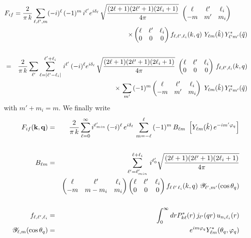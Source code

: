 \begin{eqnarray*}
\lefteqn{ F_{if} = \frac{2}{\pi \, k}  \sum_{\ell, \ell',m}
(-i)^{\ell} \,(-1)^{m} \, i^{\ell'} e^{i \delta_{\ell}} \,
\sqrt{\frac{(2 \ell + 1)(2 \ell' + 1)(2 \ell_{i} + 1)}{4 \pi }} \
\left( 
\begin{matrix}\ell & \ell' & \ell_{i} \cr -m & m' & m_{i}
\end{matrix}
\right)}
\\
 && {\times} \left( \begin{matrix}\ell & \ell' & \ell_{i} \cr 0 & 0 & 0
   \end{matrix}
 \right) f_{\ell,\ell',\ell_{i}}(k,q) \ Y_{\ell m}(\hat{k})\,
Y^{*}_{\ell' m'} (\hat{q})
 \\
\\
&=& \frac{2}{\pi \, k} \sum_{\ell'} \sum_{\ell=\mid \ell'-\ell_{i}\mid
}^{\ell' + \ell_{i}} \, i^{\ell'} \, (-i)^{\ell} e^{i
\delta_{\ell}} \, \sqrt{\frac{(2 \ell + 1)(2 \ell' + 1)(2 \ell_{i} +
1)}{4 \pi }} \ \left( \begin{matrix}\ell & \ell' & \ell_{i} \cr 0 & 0 & 0
\end{matrix}
\right) \, f_{\ell,\ell',\ell_{i}}(k,q)
\\
&& {\times} \,\sum_{m'} \, (-1)^{m} \left( 
\begin{matrix}\ell & \ell' & \ell_{i} \cr
-m & m' & m_{i}
\end{matrix}
\right) \ Y_{\ell m}(\hat{k})\, Y^{*}_{\ell' m'}
(\hat{q})
\end{eqnarray*}
%
with $m'+ m_{i}= m$. We finally write
%
\begin{eqnarray}\label{Q:ap6}
F_{if}(\mathbf{k},\mathbf{q})&=& \frac{2}{\pi \, k} \sum_{\ell=0}^{\infty}
i^{\ell'_{min}} \, (-i)^{\ell} \, e^{i \delta_{\ell}} \,
\sum_{m=-\ell}^{\ell} \, (-1)^{m} \, B_{\ell m} \ \left[ Y_{\ell
m}(\hat{k})\, e^{-i m' \varphi_{q}} \right]
\\
\nonumber
\\
B_{\ell m} &=& \sum_{\ell'=\ell'_{min}}^{\ell + \ell_{i}} \,
i^{\ell'_{0}} \sqrt{\frac{(2 \ell + 1)(2 \ell' + 1)(2 \ell_{i} +
1)}{4 \pi }}
\\
&& \left( \begin{matrix}\ell & \ell' & \ell_{i} \cr -m & m-m_{i} & m_{i}
  \end{matrix}
\right) \left( \begin{matrix}\ell & \ell' & \ell_{i} \cr 0 & 0 & 0
  \end{matrix}
\right)
f_{\ell \, \ell'\, \ell_{i}}(k,q) \ \mathcal{Y}_{\ell',m'}(\cos
\theta_{q}) \nonumber
\\
\nonumber \\
f_{\ell,\ell',\ell_{i}} &=& \int_{0}^{\infty} d r  P^{*}_{k \ell}(r)
\, j_{\ell'}(q r) \, u_{n_{i}\ell_{i}}(r)
\\
\mathcal{Y}_{\ell,m}(\cos \theta_{q}) &=&  e^{i m \varphi_{q}}
Y^{*}_{\ell m} (\theta_{q},\varphi_{q}) \label{Q:ap9}
\end{eqnarray}
